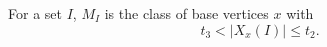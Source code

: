 \begin{definition}
For a set \(I\), \(M_I\) is the class of base vertices \(x\) with
\[
t_3<|X_x(I)|\le t_2.
\]
\end{definition}
